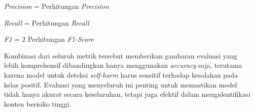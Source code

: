 \begin{equationcaptioned}[eq:precision]{
\textit{Precision} = 
}{
Perhitungan \textit{Precision}
}
\end{equationcaptioned}

\begin{equationcaptioned}[eq:recall]{
\textit{Recall} = 
}{
Perhitungan \textit{Recall}
}
\end{equationcaptioned}

\begin{equationcaptioned}[eq:f1-score]{
\textit{F1} = 
2 \times 
{}
}{
Perhitungan \textit{F1-Score}
}
\end{equationcaptioned}

Kombinasi dari seluruh metrik tersebut memberikan gambaran evaluasi yang lebih komprehensif dibandingkan hanya menggunakan \textit{accuracy} saja, terutama karena model untuk deteksi \textit{self-harm} harus sensitif terhadap kesalahan pada kelas positif. Evaluasi yang menyeluruh ini penting untuk memastikan model tidak hanya akurat secara keseluruhan, tetapi juga efektif dalam mengidentifikasi konten berisiko tinggi. \par
